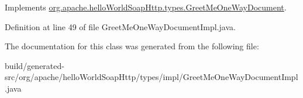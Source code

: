 Implements \hyperlink{interfaceorg_1_1apache_1_1hello_world_soap_http_1_1types_1_1_greet_me_one_way_document_a801e4453fd641fcbfcb1e7e6937dcd19}{org.\+apache.\+hello\+World\+Soap\+Http.\+types.\+Greet\+Me\+One\+Way\+Document}.



Definition at line 49 of file Greet\+Me\+One\+Way\+Document\+Impl.\+java.



The documentation for this class was generated from the following file\+:\begin{DoxyCompactItemize}
\item 
build/generated-\/src/org/apache/hello\+World\+Soap\+Http/types/impl/Greet\+Me\+One\+Way\+Document\+Impl.\+java\end{DoxyCompactItemize}
